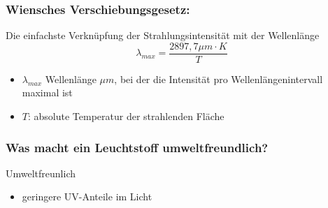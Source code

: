 \documentclass{beamer}
\begin{document}
\begin{frame}[t]\frametitle{Wiensches Verschiebungsgesetz: }
Die einfachste Verknüpfung der Strahlungsintensität mit der Wellenlänge     
\begin{equation}
    \lambda _{max}=\frac{2897,7 \mu m \cdot K}{T}
  \end{equation}
  \begin{itemize}
  \item \footnotesize $\lambda _{max}$ Wellenlänge $\mu m$, bei der die Intensität pro Wellenlängenintervall maximal ist
  \item \footnotesize  $T$: absolute Temperatur der strahlenden Fläche
\end{itemize}
\end{frame}



\begin{frame}[t]\frametitle{Was macht ein Leuchtstoff umweltfreundlich?}
  \begin{beamerboxesrounded}[]{Umweltfreunlich}
  \begin{itemize}
   \item geringere UV-Anteile im Licht 
  \end{itemize}
  \end{beamerboxesrounded}
 
\end{frame}
\end{document}
